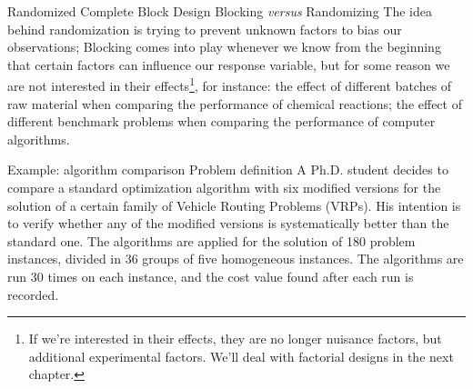 \documentclass[t]{beamer}
\begin{document}

\begin{ftst}
{Randomized Complete Block Design}
{Blocking \textit{versus} Randomizing}
The idea behind randomization is trying to prevent unknown factors to bias our observations;
\vone
Blocking comes into play whenever we know from the beginning that certain factors can influence our response variable, but for some reason we are not interested in their effects\footnote[1]{\tiny If we're interested in their effects, they are no longer nuisance factors, but additional experimental factors. We'll deal with factorial designs in the next chapter.}, for instance:
\vhalf
\bitems the effect of different batches of raw material when comparing the performance of chemical reactions;
\spitem the effect of different benchmark problems when comparing the performance of computer algorithms.
\eitem
\end{ftst}


\begin{ftst}
{Example: algorithm comparison}
{Problem definition}
A Ph.D. student decides to compare a standard optimization algorithm with six modified versions for the solution of a certain family of Vehicle Routing Problems (VRPs). His intention is to verify whether any of the modified versions is systematically better than the standard one.
\vone
The algorithms are applied for the solution of 180 problem instances, divided in 36 groups of five homogeneous instances. The algorithms are run 30 times on each instance, and the cost value found after each run is recorded.
\end{ftst}
\end{document}
